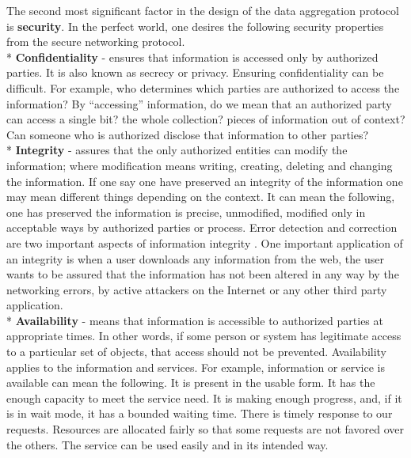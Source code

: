 	The second most significant factor in the design of the data aggregation protocol is \textbf{security}. 
	In the perfect world, one desires the following security properties from the secure networking protocol.\\*
	\textbf{Confidentiality} - ensures that information is accessed only by authorized parties.
	It is also known as secrecy or privacy.
	Ensuring confidentiality can be difficult.
	For example, who determines which parties are authorized to access the information?
	By ``accessing'' information, do we mean that an authorized party can access a single bit? the whole collection? pieces of information out of context?
	Can someone who is authorized disclose that information to other parties?\cite{pfleeger2002security}
	\\*
	\textbf{Integrity} - assures that the only authorized entities can modify the information; where modification means writing, creating, deleting and changing the information. 
	If one say one have preserved an integrity of the information one may mean different things depending on the context.
	It can mean the following, one has preserved the information is precise, unmodified, modified only in acceptable ways by authorized parties or process.
	Error detection and correction are two important aspects of information integrity \cite{pfleeger2002security}.
	One important application of an integrity is when a user downloads any information from the web, the user wants to be assured that the information has not been altered in any way by the networking errors, by active attackers on the Internet or any other third party application.\\*
	\textbf{Availability} - means that information is accessible to authorized parties at appropriate times.
	In other words, if some person or system has legitimate access to a particular set of objects, that access should not be prevented.
	Availability applies to the information and services.
	For example, information or service is available can mean the following. 
	It is present in the usable form.
	It has the enough capacity to meet the service need.
	It is making enough progress, and, if it is in wait mode, it has a bounded waiting time. There is timely response to our requests.
	Resources are allocated fairly so that some requests are not favored over the others. The service can be used easily and in its intended way.
